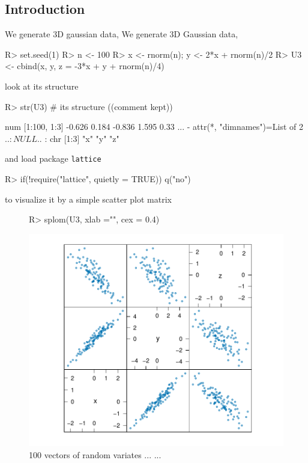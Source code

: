 \documentclass{article}
\begin{document}
\subsection*{Introduction}

We generate 3D gaussian data,
We generate 3D Gaussian data,
\begin{Schunk}
\begin{Sinput}
R> set.seed(1)
R> n <- 100
R> x <- rnorm(n); y <- 2*x + rnorm(n)/2
R> U3 <- cbind(x, y, z = -3*x + y + rnorm(n)/4)
\end{Sinput}
\end{Schunk}
look at its structure
\begin{Schunk}
\begin{Sinput}
R> str(U3) # its structure ((comment kept))
\end{Sinput}
\begin{Soutput}
 num [1:100, 1:3] -0.626 0.184 -0.836 1.595 0.33 ...
 - attr(*, "dimnames")=List of 2
  ..$ : NULL
  ..$ : chr [1:3] "x" "y" "z"
\end{Soutput}
\end{Schunk}
and load package \texttt{lattice}
\begin{Schunk}
\begin{Sinput}
R> if(!require("lattice", quietly = TRUE)) q("no")
\end{Sinput}
\end{Schunk}
to visualize it by a simple scatter plot matrix
\begin{figure}[h!]
\centering
\begin{Schunk}
\begin{Sinput}
R> splom(U3, xlab ="", cex = 0.4)
\end{Sinput}
\end{Schunk}
\includegraphics{swv-keepSrc-1-splom}
\caption{100 vectors of random variates ... ...}
\label{fig:AC_Joe}
\end{figure}
\end{document}
